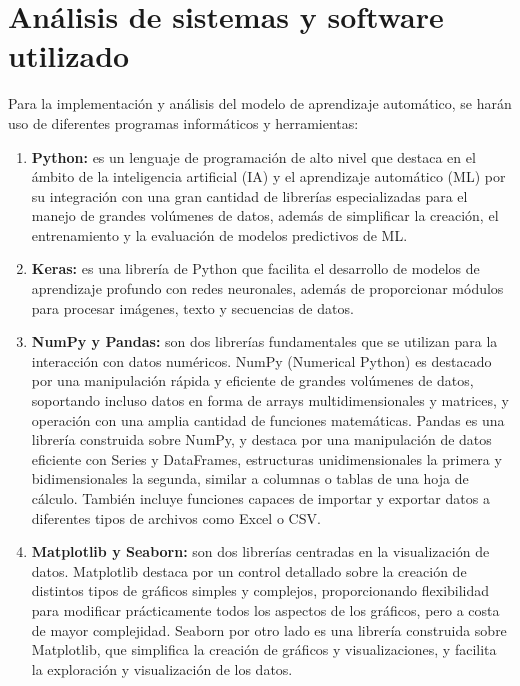 \documentclass[12pt]{report} %
\begin{document}
\section{Análisis de sistemas y software utilizado}

Para la implementación y análisis del modelo de aprendizaje automático, se harán uso de diferentes programas informáticos y herramientas:

\begin{enumerate}

    \item \textbf{Python:} es un lenguaje de programación de alto nivel que destaca en el ámbito de la inteligencia artificial (IA) y el aprendizaje automático (ML) por su integración con una gran cantidad de librerías especializadas para el manejo de grandes volúmenes de datos, además de simplificar la creación, el entrenamiento y la evaluación de modelos predictivos de ML. \cite{python}
    \item \textbf{Keras:} es una librería de Python que facilita el desarrollo de modelos de aprendizaje profundo con redes neuronales, además de proporcionar módulos para procesar imágenes, texto y secuencias de datos. \cite{keras}
    \item \textbf{NumPy y Pandas:} son dos librerías fundamentales que se utilizan para la interacción con datos numéricos. NumPy (Numerical Python) es destacado por una manipulación rápida y eficiente de grandes volúmenes de datos, soportando incluso datos en forma de arrays multidimensionales y matrices, y operación con una amplia cantidad de funciones matemáticas. \cite{numpy} Pandas es una librería construida sobre NumPy, y destaca por una manipulación de datos eficiente con Series y DataFrames, estructuras unidimensionales la primera y bidimensionales la segunda, similar a columnas o tablas de una hoja de cálculo. También incluye funciones capaces de importar y exportar datos a diferentes tipos de archivos como Excel o CSV. \cite{pandas}
	\item \textbf{Matplotlib y Seaborn:} son dos librerías centradas en la visualización de datos. Matplotlib destaca por un control detallado sobre la creación de distintos tipos de gráficos simples y complejos, proporcionando flexibilidad para modificar prácticamente todos los aspectos de los gráficos, pero a costa de mayor complejidad. \cite{matplotlib} Seaborn por otro lado es una librería construida sobre Matplotlib, que simplifica la creación de gráficos y visualizaciones, y facilita la exploración y visualización de los datos. \cite{seaborn}

\end{enumerate}
\end{document}
